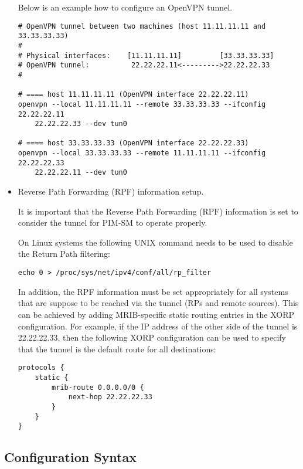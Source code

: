 \begin{itemize}
  Below is an example how to configure an OpenVPN tunnel.

\begin{verbatim}
# OpenVPN tunnel between two machines (host 11.11.11.11 and 33.33.33.33)
#
# Physical interfaces:    [11.11.11.11]         [33.33.33.33]
# OpenVPN tunnel:          22.22.22.11<--------->22.22.22.33
#

# ==== host 11.11.11.11 (OpenVPN interface 22.22.22.11)
openvpn --local 11.11.11.11 --remote 33.33.33.33 --ifconfig 22.22.22.11
    22.22.22.33 --dev tun0

# ==== host 33.33.33.33 (OpenVPN interface 22.22.22.33)
openvpn --local 33.33.33.33 --remote 11.11.11.11 --ifconfig 22.22.22.33
    22.22.22.11 --dev tun0
\end{verbatim}

  \item Reverse Path Forwarding (RPF) information setup.

  It is important that the Reverse Path Forwarding (RPF) information
  is set to consider the tunnel for PIM-SM to operate properly.

  On Linux systems the following UNIX command needs to be used to
  disable the Return Path filtering:

\begin{verbatim}
echo 0 > /proc/sys/net/ipv4/conf/all/rp_filter
\end{verbatim}

  In addition, the RPF information must be set appropriately for all
  systems that are suppose to be reached via the tunnel (\eg RPs and
  remote sources). This can be achieved by adding MRIB-specific static
  routing entries in the XORP configuration. For example, if the IP
  address of the other side of the tunnel is 22.22.22.33, then the
  following XORP configuration can be used to specify that the tunnel is
  the default route for all destinations:

\begin{verbatim}
protocols {
    static {
        mrib-route 0.0.0.0/0 {
            next-hop 22.22.22.33
        }
    }
}
\end{verbatim}

\end{itemize}

\newpage
\subsection{Configuration Syntax}

